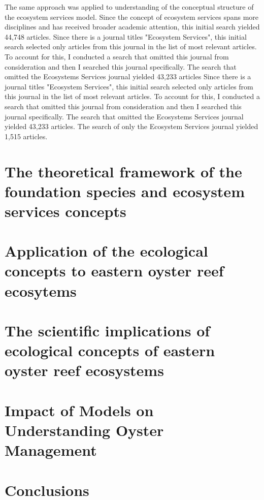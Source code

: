 \documentclass{article}
\begin{document}
The same approach was applied to understanding of the conceptual structure of the ecosystem services model. Since the concept of ecosystem services spans more disciplines and has received broader academic attention, this initial search yielded 44,748 articles. Since there is a journal titles "Ecosystem Services", this initial search selected only articles from this journal in the list of most relevant articles. To account for this, I conducted a search that omitted this journal from consideration and then I searched this journal specifically. The search that omitted the Ecosystems Services journal yielded 43,233 articles Since there is a journal titles "Ecosystem Services", this initial search selected only articles from this journal in the list of most relevant articles. To account for this, I conducted a search that omitted this journal from consideration and then I searched this journal specifically. The search that omitted the Ecosystems Services journal yielded 43,233 articles. The search of only the Ecosystem Services journal yielded 1,515 articles.  

\section*{The theoretical framework of the foundation species and ecosystem services concepts}
\label{sec:theoretical_framework}


\section*{Application of the ecological concepts to eastern oyster reef ecosytems}
\label{sec:concept_application}

\section*{The scientific implications of ecological concepts of eastern oyster reef ecosystems}
\label{sec:scientific_implications}

\section*{Impact of Models on Understanding Oyster Management}
\label{sec:impact_of_models}

\section*{Conclusions}
\label{sec:conclusions}



\end{document}
